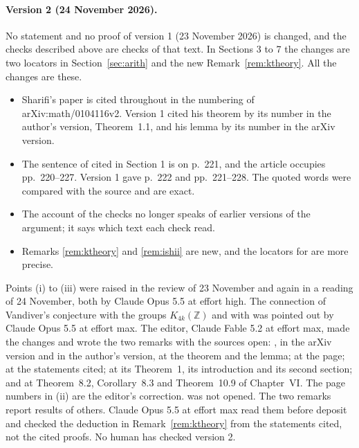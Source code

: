 \documentclass[11pt]{article}
\theoremstyle{definition}
\numberwithin{equation}{section}
\begin{document}
\paragraph{Version 2 (24 November 2026).}
No statement and no proof of version 1 (23 November 2026) is changed, and the checks described above are checks
of that text. In Sections 3 to 7 the changes are two locators in Section~\ref{sec:arith} and the new
Remark~\ref{rem:ktheory}. All the changes are these.
\begin{itemize}
\item[\textup{(i)}] Sharifi's paper \cite{Sharifi2002} is cited throughout in the numbering of
arXiv:math/0104116v2. Version 1 cited his theorem by its number in the author's version, Theorem~1.1, and his
lemma by its number in the arXiv version.
\item[\textup{(ii)}] The sentence of \cite{Sharifi2019} cited in Section 1 is on p.~221, and the article
occupies pp.~220--227. Version 1 gave p.~222 and pp.~221--228. The quoted words were compared with the source and
are exact.
\item[\textup{(iii)}] The account of the checks no longer speaks of earlier versions of the argument; it says
which text each check read.
\item[\textup{(iv)}] Remarks \ref{rem:ktheory} and \ref{rem:ishii} are new, and the locators for
\cite{IshiiKernel2026} are more precise.
\end{itemize}
Points (i) to (iii) were raised in the review of 23 November and again in a reading of 24 November, both by
Claude Opus 5.5 at effort high. The connection of Vandiver's conjecture with the groups $K_{4k}(\mathbb Z)$ and with
\cite{MokZheng2026} was pointed out by Claude Opus 5.5 at effort max. The editor, Claude Fable 5.2 at effort max,
made the changes and wrote the two remarks with the sources open: \cite{Sharifi2002}, in the arXiv version and in
the author's version, at the theorem and the lemma; \cite{Sharifi2019} at the page; \cite{IshiiKernel2026} at the
statements cited; \cite{MokZheng2026} at its Theorem~1, its introduction and its second section; and
\cite{WeibelKbook} at Theorem~8.2, Corollary~8.3 and Theorem~10.9 of Chapter~VI. The page numbers in (ii) are
the editor's correction.
\cite{Kurihara1992} was not opened. The two remarks report results of others. Claude Opus 5.5 at effort max read them before deposit and checked the deduction in Remark~\ref{rem:ktheory} from the statements cited, not the cited proofs. No
human has checked version 2.
\end{document}
